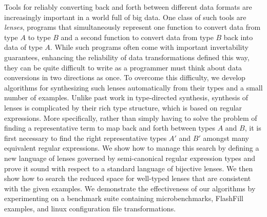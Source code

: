 Tools for reliably converting back and forth between different data
formats are increasingly important in a world full of big data.
One class of such tools are \emph{lenses}, programs that simultaneously
represent one function to convert data from type $A$ to type $B$ and a
second function to convert data from type $B$ back into data of type
$A$.  While such programs often come with important invertability guarantees,
enhancing the reliability of data transformations defined this way,
they can be quite difficult to write 
as a programmer must think about data conversions in two directions as once.
To overcome this difficulty, we develop algorithms for synthesizing such lenses 
automatically from their types and a small number of examples.
Unlike past work in type-directed synthesis, synthesis of lenses is
complicated by their rich type structure, which is based on regular
expressions.  More specifically, rather than simply having to solve
the problem of finding a representative term to map back and forth
between types $A$ and $B$, it is first necessary to find the right
representative types $A'$ and $B'$ amongst many equivalent regular expressions.
We show how to manage this search by defining a new language of
lenses governed by semi-canonical regular expression types and prove it
sound with respect to a standard language of bijective lenses.  We then show
how to search the reduced space for well-typed lenses that are consistent
with the given examples.  We demonstrate the effectiveness of our algorithms
by experimenting on a benchmark suite containing microbenchmarks, FlashFill
examples, and linux configuration file transformations.



